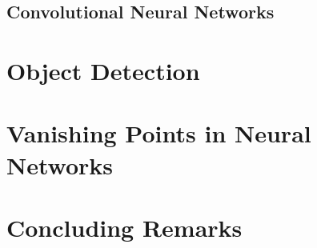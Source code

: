 \begin{spacing}{1.5}
\subsection{Convolutional Neural Networks}

\section{Object Detection}
\label{sec:LR_objectdetection}



\section{Vanishing Points in Neural Networks}
\label{sec:LR_vpinNN}

\section{Concluding Remarks}

\end{spacing}
\newpage
